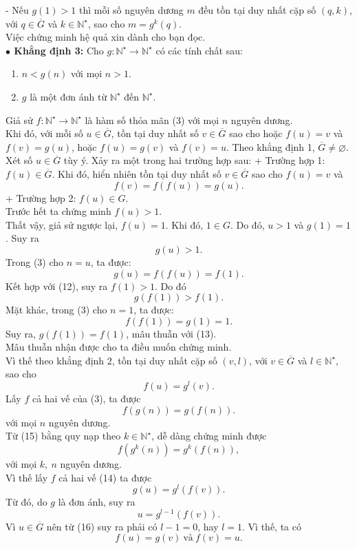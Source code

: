 - Nếu $g(1)>1$ thì mỗi số nguyên dương $m$ đều tồn tại duy nhất cặp số $(q,k)$, với $q\in \overline{G}$ và $k\in\mathbb{N}^\star$, sao cho $m=g^k(q)$.\\
Việc chứng minh hệ quả xin dành cho bạn đọc.\\ 
{\bf$\bullet$ Khẳng định 3:} Cho $g: \mathbb{N}^\star\longrightarrow\mathbb{N}^\star$ có các tính chất sau:
\begin{enumerate}
	\item $n<g(n)$ với mọi $n>1$.
	\item $g$ là một đơn ánh từ $\mathbb{N}^\star$ đến $\mathbb{N}^\star$.
	
\end{enumerate}
Giả sử $f: \mathbb{N}^\star\longrightarrow\mathbb{N}^\star$ là hàm số thỏa mãn (3) với mọi $n$ nguyên dương.\\
Khi đó, với mỗi số $u\in \overline{G}$, tồn tại duy nhất số $v\in\overline{G}$ sao cho hoặc $f(u)=v$ và $f(v)=g(u)$, hoặc $f(u)=g(v)$ và $f(v)=u$.
\cm Theo khẳng định 1, $\overline{G}\ne \varnothing$.\\
Xét số $u\in\overline{G}$ tùy ý. Xảy ra một trong hai trường hợp sau:
+ Trường hợp 1: $f(u)\in \overline{G}$. Khi đó, hiển nhiên tồn tại duy nhất số $v\in\overline{G}$ sao cho $f(u)=v$ và $$f(v)=f(f(u))=g(u).$$
+ Trường hợp 2: $f(u)\in G$.\\
Trước hết ta chứng minh $f(u)>1$.\\
Thất vậy, giả sử ngược lại, $f(u)=1$. Khi đó, $1\in G$. Do đó, $u>1$ và $g(1)=1$. Suy ra \[g(u)>1. \tag{12}\]
Trong (3) cho $n=u$, ta được:
$$g(u)=f(f(u))=f(1).$$
Kết hợp với (12), suy ra $f(1)>1$. Do đó 
\[g(f(1))>f(1).\tag{13}\]
Mặt khác, trong (3) cho $n=1$, ta được:
$$f(f(1))=g(1)=1.$$
Suy ra, $g(f(1))=f(1)$, mâu thuẫn với (13).\\ Mâu thuẫn nhận được cho ta điều muốn chứng minh.\\
Vì thế theo khẳng định 2, tồn tại duy nhất cặp số $(v,l)$, với $v\in\overline{G}$ và $l\in\mathbb{N}^\star$, sao cho \[f(u)=g^l(v).\tag{14}\]
Lấy $f$ cả hai vế của (3), ta được \[f(g(n))=g(f(n)). \tag{15}\]
với mọi $n$ nguyên dương.\\
Từ (15) bằng quy nạp theo $k\in\mathbb{N}^\star$, dễ dàng chứng minh được 
$$f(g^k(n))=g^k(f(n)),$$
với mọi $k,\ n$ nguyên dương.\\
Vì thế lấy $f$ cả hai vế (14) ta được
$$g(u)=g^l(f(v)).$$
Từ đó, do $g$ là đơn ánh, suy ra \[u=g^{l-1}(f(v)). \tag{16}\]
Vì $u\in\overline{G}$ nên từ (16) suy ra phải có  $l-1=0$, hay $l=1$. Vì thế, ta có $$f(u)=g(v)\ \text{và}\ f(v)=u.$$
